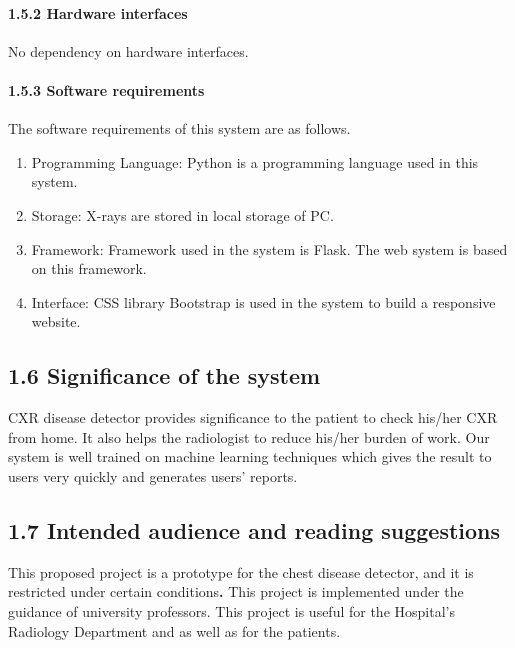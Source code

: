 \documentclass{article} %
\begin{document}
\noindent 
\paragraph{1.5.2 Hardware interfaces}

\noindent No dependency on hardware interfaces.

\noindent 
\paragraph{1.5.3 Software requirements}

\noindent The software requirements of this system are as follows. 

\begin{enumerate}
\item  Programming Language: Python is a programming language used in this system.

\item  Storage: X-rays are stored in local storage of PC.

\item  Framework: Framework used in the system is Flask. The web system is based on this framework.

\item  Interface: CSS library Bootstrap is used in the system to build a responsive website.
\end{enumerate}

\noindent 
\subsection{1.6 Significance of the system}

\noindent CXR disease detector provides significance to the patient to check his/her CXR from home. It also helps the radiologist to reduce his/her burden of work. Our system is well trained on machine learning techniques which gives the result to users very quickly and generates users' reports. 

\noindent 
\subsection{1.7 Intended audience and reading suggestions}

\noindent This proposed project is a prototype for the chest disease detector, and it is restricted under certain conditions\textbf{. }This\textbf{ }project is implemented under the guidance of university professors. This project is useful for the Hospital's Radiology\textbf{ }Department and as well as for the patients.
\end{document}
